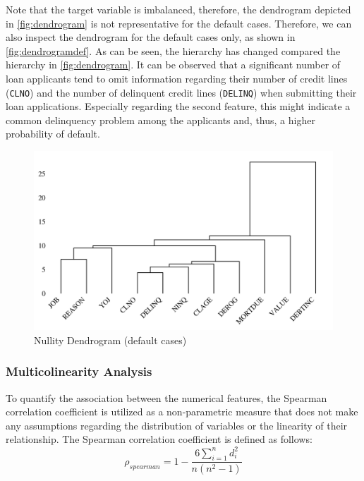 Note that the target variable is imbalanced, therefore, the dendrogram depicted in \autoref{fig:dendrogram} is not representative for the default cases. Therefore, we can also inspect the dendrogram for the default cases only, as shown in \autoref{fig:dendrogramdef}.
As can be seen, the hierarchy has changed compared the hierarchy in \autoref{fig:dendrogram}. It can be observed that a significant number of loan applicants tend to omit information regarding their number of credit lines (\texttt{CLNO}) and the number of delinquent credit lines (\texttt{DELINQ}) when submitting their loan applications. Especially regarding the second feature, this might indicate a common delinquency problem among the applicants and, thus, a higher probability of default.
\begin{figure}[H]
    \centering
    \caption{Nullity Dendrogram (default cases)}\vspace{0.5em}
    \label{fig:dendrogramdef}
    \includegraphics[width=140mm]{Figures/NA_Dendrogram_defaults.jpg}

    \vspace{-1em}
\end{figure}

\subsubsection{Multicolinearity Analysis}
\label{subsubsec:multicolinearity}
To quantify the association between the numerical features, the Spearman correlation coefficient is utilized as  a non-parametric measure that does not make any assumptions regarding the distribution of variables or the linearity of their relationship.
The Spearman correlation coefficient is defined as follows:
\begin{equation}\label{eq}
\rho_{spearman} = 1 - \frac{6 \sum_{i=1}^{n} d_{i}^{2}}{n \left(n^{2}-1\right)}
\end{equation}

